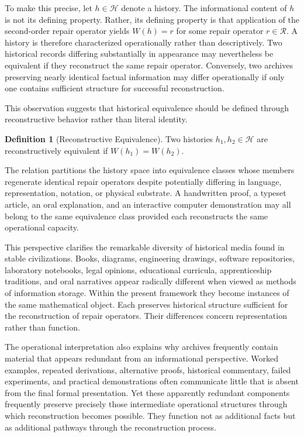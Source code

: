 \documentclass[12pt,oneside]{article}
\theoremstyle{plain}
\theoremstyle{definition}
\newtheorem{definition}[theorem]{Definition}
\theoremstyle{remark}
\theoremstyle{plain}
\newcommand{\Hist}{\mathcal{H}}
\begin{document}
To make this precise, let $h \in \Hist$ denote a history. The informational content of $h$ is not
its defining property. Rather, its defining property is that application of the second-order repair
operator yields $W(h) = r$ for some repair operator $r \in \mathcal{R}$. A history is therefore
characterized operationally rather than descriptively. Two historical records differing
substantially in appearance may nevertheless be equivalent if they reconstruct the same repair
operator. Conversely, two archives preserving nearly identical factual information may differ
operationally if only one contains sufficient structure for successful reconstruction.

This observation suggests that historical equivalence should be defined through reconstructive
behavior rather than literal identity.

\begin{definition}[Reconstructive Equivalence]
Two histories $h_1, h_2 \in \Hist$ are reconstructively equivalent if $W(h_1) = W(h_2)$.
\end{definition}

The relation partitions the history space into equivalence classes whose members regenerate
identical repair operators despite potentially differing in language, representation, notation, or
physical substrate. A handwritten proof, a typeset article, an oral explanation, and an interactive
computer demonstration may all belong to the same equivalence class provided each reconstructs the
same operational capacity.

This perspective clarifies the remarkable diversity of historical media found in stable
civilizations. Books, diagrams, engineering drawings, software repositories, laboratory notebooks,
legal opinions, educational curricula, apprenticeship traditions, and oral narratives appear
radically different when viewed as methods of information storage. Within the present framework
they become instances of the same mathematical object. Each preserves historical structure
sufficient for the reconstruction of repair operators. Their differences concern representation
rather than function.

The operational interpretation also explains why archives frequently contain material that appears
redundant from an informational perspective. Worked examples, repeated derivations, alternative
proofs, historical commentary, failed experiments, and practical demonstrations often communicate
little that is absent from the final formal presentation. Yet these apparently redundant components
frequently preserve precisely those intermediate operational structures through which reconstruction
becomes possible. They function not as additional facts but as additional pathways through the
reconstruction process.
\end{document}
